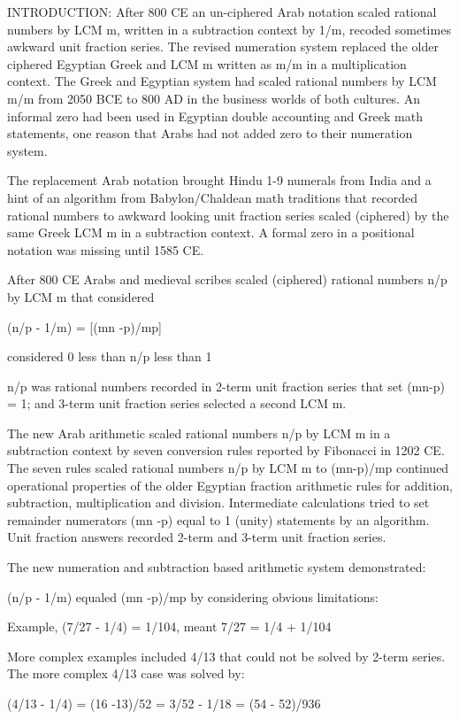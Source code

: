 \documentclass[12pt]{article}
\begin{document}
INTRODUCTION: After 800 CE an un-ciphered Arab notation scaled rational numbers by LCM m, written in a subtraction context by 1/m, recoded sometimes awkward unit fraction series. The revised numeration system replaced the older ciphered Egyptian Greek and LCM m written as m/m in a  multiplication context. The Greek and Egyptian system had scaled rational numbers by LCM m/m from 2050 BCE to 800 AD in the business worlds of both cultures. An informal zero had been used in Egyptian double accounting and Greek math statements, one reason that Arabs had not added zero to their numeration system.

The replacement Arab  notation brought Hindu 1-9 numerals from India and a hint of an algorithm from Babylon/Chaldean math traditions that recorded rational numbers to awkward looking unit fraction series scaled (ciphered) by the same Greek LCM m in a subtraction context. A formal zero in a positional notation was missing until 1585 CE. 

After 800 CE  Arabs and medieval scribes scaled (ciphered) rational numbers n/p by LCM m that considered 

(n/p - 1/m) = [(mn -p)/mp]

considered 0 less than n/p less than 1

n/p was  rational numbers recorded in 2-term unit fraction series that set (mn-p) = 1; and 3-term unit fraction series selected a second LCM m.

The new Arab arithmetic scaled rational numbers n/p by LCM m in a subtraction context by seven conversion rules reported by Fibonacci in 1202 CE. The seven rules scaled rational numbers n/p by LCM m to (mn-p)/mp continued operational properties of the older Egyptian fraction arithmetic rules for addition, subtraction, multiplication and division. Intermediate calculations tried to set remainder numerators (mn -p) equal to 1 (unity) statements by an algorithm. Unit fraction answers recorded 2-term and 3-term unit fraction series. 

The new numeration and subtraction based arithmetic system demonstrated:

(n/p - 1/m) equaled  (mn -p)/mp by considering obvious limitations:

Example, (7/27 - 1/4) = 1/104, meant 7/27 = 1/4 + 1/104

More complex examples included 4/13 that could not be solved by 2-term series.
The more complex 4/13 case was solved by: 

(4/13 - 1/4) = (16 -13)/52 = 3/52 - 1/18 = (54 - 52)/936
\end{document}
